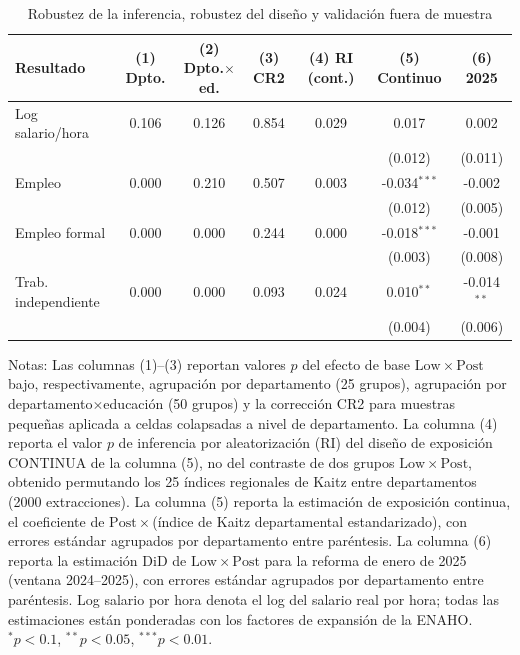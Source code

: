 \begin{table}[!tbp]\centering
\caption{Robustez de la inferencia, robustez del diseño y validación fuera de muestra}\label{tab:inference}
\begin{threeparttable}
\footnotesize
\setlength{\tabcolsep}{3.5pt}
\begin{tabular}{lcccccc}
\toprule
Resultado & (1) Dpto. & (2) Dpto.$\times$ed. & (3) CR2 & (4) RI (cont.) & (5) Continuo & (6) 2025 \\
\midrule
Log salario/hora & 0.106 & 0.126 & 0.854 & 0.029 & 0.017 & 0.002 \\
 & & & & & (0.012) & (0.011) \\
Empleo & 0.000 & 0.210 & 0.507 & 0.003 & -0.034$^{***}$ & -0.002 \\
 & & & & & (0.012) & (0.005) \\
Empleo formal & 0.000 & 0.000 & 0.244 & 0.000 & -0.018$^{***}$ & -0.001 \\
 & & & & & (0.003) & (0.008) \\
Trab. independiente & 0.000 & 0.000 & 0.093 & 0.024 & 0.010$^{**}$ & -0.014$^{**}$ \\
 & & & & & (0.004) & (0.006) \\
\bottomrule
\end{tabular}
\begin{tablenotes}\footnotesize
\item Notas: Las columnas (1)--(3) reportan valores $p$ del efecto de base $\mathrm{Low}\times\mathrm{Post}$ bajo, respectivamente, agrupación por departamento (25 grupos), agrupación por departamento$\times$educación (50 grupos) y la corrección CR2 para muestras pequeñas \citep{pustejovsky_tipton_2018} aplicada a celdas colapsadas a nivel de departamento. La columna (4) reporta el valor $p$ de inferencia por aleatorización (RI) del diseño de exposición CONTINUA de la columna (5), no del contraste de dos grupos $\mathrm{Low}\times\mathrm{Post}$, obtenido permutando los 25 índices regionales de Kaitz entre departamentos (2000 extracciones). La columna (5) reporta la estimación de exposición continua, el coeficiente de $\mathrm{Post}\times$(índice de Kaitz departamental estandarizado), con errores estándar agrupados por departamento entre paréntesis. La columna (6) reporta la estimación DiD de $\mathrm{Low}\times\mathrm{Post}$ para la reforma de enero de 2025 (ventana 2024--2025), con errores estándar agrupados por departamento entre paréntesis. Log salario por hora denota el log del salario real por hora; todas las estimaciones están ponderadas con los factores de expansión de la ENAHO. $^{*}p<0.1$, $^{**}p<0.05$, $^{***}p<0.01$.
\end{tablenotes}
\end{threeparttable}\end{table}
